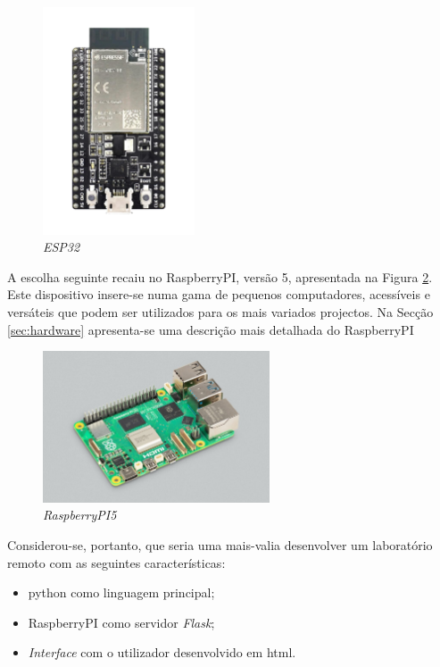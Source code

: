 \begin{figure}[hbtp]
    \centering
    \includegraphics[width=0.4\textwidth]{figures/ESP32-DevKitC_L_0.png}
    \caption{\textit{ESP32} \cite{ESPDevKit}}
    \label{fig:ESP32}
\end{figure}

A escolha seguinte recaiu no \gls{RaspberryPI}, versão 5, apresentada na Figura \ref{fig:Raspberrypi5}. Este dispositivo insere-se numa gama de pequenos computadores, acessíveis e versáteis que podem ser utilizados para os mais variados projectos. Na Secção \ref{sec:hardware} apresenta-se uma descrição mais detalhada do \gls{RaspberryPI}

\begin{figure}[hbtp]
    \centering
    \includegraphics[width=0.6\textwidth]{figures/raspberrypi5.jpg}
    \caption{\textit{RaspberryPI5} \cite{introRaspberrypi5}}
    \label{fig:Raspberrypi5}
\end{figure}

Considerou-se, portanto, que seria uma mais-valia desenvolver um \acrshort{laboratório remoto} com as seguintes características:
\begin{itemize}
    \item \gls{python} como linguagem principal;
    \item \gls{RaspberryPI} como servidor \textit{Flask};
    \item \textit{Interface} com o utilizador desenvolvido em \acrfull{html}.
\end{itemize}

